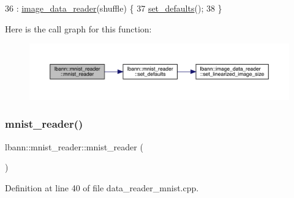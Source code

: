 \begin{DoxyCode}
36   : \hyperlink{classlbann_1_1image__data__reader_a582185ab03c4643117fd93e0ba843882}{image\_data\_reader}(shuffle) \{
37   \hyperlink{classlbann_1_1mnist__reader_a5b9a3d56e2d1e1c6820b3c7cc8cde17d}{set\_defaults}();
38 \}
\end{DoxyCode}
Here is the call graph for this function\+:\nopagebreak
\begin{figure}[H]
\begin{center}
\leavevmode
\includegraphics[width=350pt]{classlbann_1_1mnist__reader_abe2c3dd2e8d5ad42ec762fdd37bc9769_cgraph}
\end{center}
\end{figure}
\mbox{\label{classlbann_1_1mnist__reader_a7634b11fdfc3501bd75d60c567158cbf}} 
\subsubsection{\texorpdfstring{mnist\+\_\+reader()}{mnist\_reader()}\hspace{0.1cm}{\footnotesize\ttfamily [2/3]}}
{\footnotesize\ttfamily lbann\+::mnist\+\_\+reader\+::mnist\+\_\+reader (\begin{DoxyParamCaption}{ }\end{DoxyParamCaption})}



Definition at line 40 of file data\+\_\+reader\+\_\+mnist.\+cpp.


